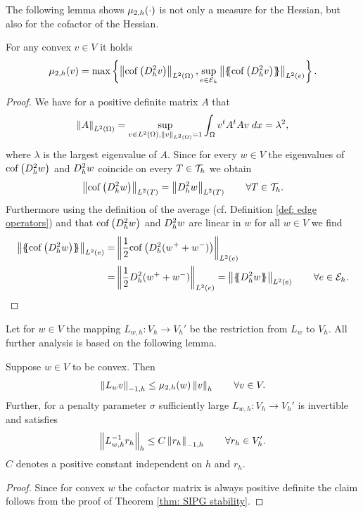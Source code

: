 The following lemma shows $\mu_{2,h}(\cdot)$ is not only a measure for the Hessian, but also for the cofactor of the Hessian.
\begin{lemma} \label{la: epsilon cof hess equal}
	For any convex $v \in V$ it holds
	\[
		\mu_{2,h}(v) = \operatorname{max} \left\{  \left\lVert \operatorname{cof} \left( D_h^2 v \right) \right\rVert_{L^2(\Omega)},  \sup_{e \in \mathcal{E}_h} \left\lVert \{\!\!\{ \operatorname{cof} \left( D_h^2 v \right) \}\!\!\} \right\rVert_{L^2(e)} \right\} .
	\]
\end{lemma}
\begin{proof}
	We have for a positive definite matrix $A$ that 
	\begin{align*}
	\left\lVert A \right\rVert_{L^2(\Omega)} =  \sup_{v \in L^2(\Omega), \left\lVert v \right\rVert_{L^2(\Omega)}=1} \int_{\Omega} {{v^t A^t A v}\;dx} = \lambda^2,
	\end{align*}
	where $\lambda$ is the largest eigenvalue of $A$. Since for every $w \in V$ the eigenvalues of $\operatorname{cof} \left( D_h^2 w \right)$ and $D_h^2 w$ coincide on every $T \in \mathcal{T}_h$ we obtain 
	\begin{align}
	\left\lVert \operatorname{cof} \left( D_h^2 w \right) \right\rVert_{L^2(T)} = \left\lVert D_h^2 w \right\rVert_{L^2(T)} \qquad \forall T \in \mathcal{T}_h.\label{eq: equality norm}
	\end{align}
	Furthermore using the definition of the average (cf. Definition \ref{def: edge operators}) and that $\operatorname{cof} \left( D_h^2 w \right)$ and $D_h^2 w$ are linear in $w$ for all $w \in V$ we find
	\begin{align}
	\LTwonormE{\average {\cofHessH{w}}} 
	=& \LTwonormE{\frac 1 2 {\cofHessH{(w^+ + w^-)}}} \nonumber\\
	=& \LTwonormE{\frac 1 2 {\hess{(w^+ + w^-)}}} 
	= \LTwonormE{\average {\hess{w}}} \qquad \forall e \in \edges. \label{eq: equality norm average}
	\end{align}
	\phantom{blub}
\end{proof}

Let for $w \in V$ the mapping $L_{w,h}:V_h \rightarrow V_h'$ be the restriction from $L_w$ to $V_h$. All further analysis is based on the following lemma.
\begin{lemma}[Stability] \label{la: stability L}
	Suppose $w \in V$ to be convex. Then 
	\begin{align}
		\left\lVert L_{w}v \right\rVert_{-1,h} \leq \mu_{2,h}(w) \left\lVert v \right\rVert_{h} \qquad \forall v \in V.
	\end{align}
	Further, for a penalty parameter $\sigma $ sufficiently large $L_{w,h}: V_h \rightarrow V_h'$ is invertible and satisfies
	\begin{align}
		\left\lVert L_{w,h}^{-1} r_h \right\rVert_{h} \leq C \left\lVert r_h \right\rVert_{-1,h} \qquad \forall r_h \in V_h'.
	\end{align}
	$C$ denotes a positive constant independent on $h$ and $r_h$. 
\end{lemma}
\begin{proof}
	Since for convex $w$ the cofactor matrix is always positive definite the claim follows from the proof of Theorem \ref{thm: SIPG stability}.
\end{proof}

